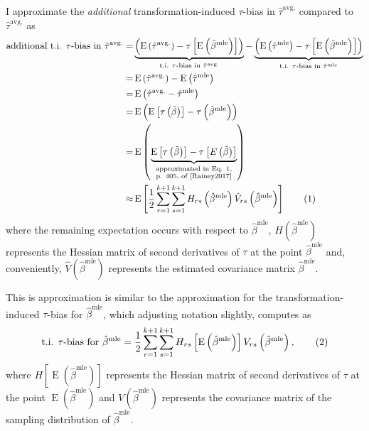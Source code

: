 \documentclass[10pt]{article}
\newcommand\numberthis{\addtocounter{equation}{1}\tag{\theequation}}
\DeclareMathOperator*{\E}{\text{E}}
\begin{document}
I approximate the \textit{additional} transformation-induced $\tau$-bias in $\hat{\tau}^\text{avg.}$ compared to $\hat{\tau}^\text{avg.}$ as
\begin{align*}
\text{additional t.i. $\tau$-bias in } \hat{\tau}^\text{avg.} =& \underbrace{\left( \E \left( \hat{\tau}^\text{avg.}\right) - \tau \left[\E \left( \hat{\beta}^\text{mle} \right) \right] \right) }_{\text{t.i. } \tau\text{-bias in }\hat{\tau}^{\text{avg.}}} - \underbrace{ \left( \E \left( \hat{\tau}^\text{mle}\right) -  \tau \left[\E \left( \hat{\beta}^\text{mle} \right) \right] \right)}_{\text{t.i. } \tau\text{-bias in }\hat{\tau}^{\text{mle}}}\\
=& \E \left( \hat{\tau}^\text{avg.}\right) - \E \left( \hat{\tau}^\text{mle}\right)\\
=& \E \left( \hat{\tau}^\text{avg.} - \hat{\tau}^\text{mle} \right)\\
=& \E \left(     \E \left[ \tau\left( \tilde{\beta} \right) \right]      -      \tau \left( \hat{\beta}^\text{mle} \right)     \right)\\
=& \E \left(     \underbrace{\E \left[ \tau\left( \tilde{\beta} \right) \right]      -      \tau \left[ E\left(  \tilde{\beta} \right)\right]}_{\substack{\text{approximated in Eq. 1,} \\ \text{p. 405, of \cite{Rainey2017}}}}   \right)\\
\approx & \E \left[ \dfrac{1}{2} \displaystyle \sum_{r = 1}^{k+1} \sum_{s = 1}^{k+1} H_{rs}\left( \hat{\beta}^\text{mle} \right) \hat{V}_{rs} \left( \hat{\beta}^{\text{mle}} \right) \right] \numberthis \label{eqn:avg-approx}
\end{align*}
where the remaining expectation occurs with respect to $\hat{\beta}^\text{mle}$, $H\left( \hat{\beta}^\text{mle} \right)$ represents the Hessian matrix of second derivatives of $\tau$ at the point $\hat{\beta}^\text{mle}$ and, conveniently, $\hat{V} \left( \hat{\beta}^{\text{mle}} \right)$ represents the estimated covariance matrix $\hat{\beta}^\text{mle}$.  

This is approximation is similar to the approximation for the transformation-induced $\tau$-bias for $\hat{\beta}^\text{mle}$, which adjusting notation slightly, \citet[p. 405, Eq. 1]{Rainey2017} computes as 
\begin{align*}
\text{t.i. } \tau \text{-bias for } \hat{\beta}^\text{mle} = \dfrac{1}{2} \displaystyle \sum_{r = 1}^{k+1} \sum_{s = 1}^{k+1} H_{rs}\left[ \E \left( \hat{\beta}^\text{mle} \right) \right] V_{rs} \left( \hat{\beta}^{\text{mle}} \right), \numberthis \label{eqn:mle-approx}
\end{align*} 
where $H\left[ \E \left( \hat{\beta}^\text{mle} \right) \right]$ represents the Hessian matrix of second derivatives of $\tau$ at the point $\E \left( \hat{\beta}^\text{mle} \right)$ and $V \left( \hat{\beta}^{\text{mle}} \right)$ represents the covariance matrix of the sampling distribution of $\hat{\beta}^\text{mle}$.
\end{document}
